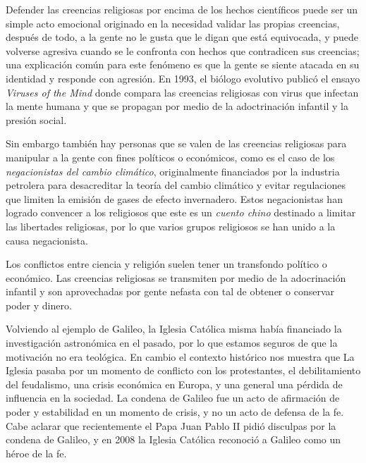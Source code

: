 Defender las creencias religiosas por encima de los hechos científicos puede ser
un simple acto emocional originado en la necesidad validar las propias
creencias, después de todo, a la gente no le gusta que le digan que está
equivocada, y puede volverse agresiva cuando se le confronta con hechos que
contradicen sus creencias; una explicación común para este fenómeno es que la
gente se siente atacada en su identidad y responde con agresión.
En 1993, el biólogo evolutivo  publicó
el ensayo \emph{Viruses of the Mind}\cite{Dahlbom1993-ky} donde compara las
creencias religiosas con virus que infectan la mente humana y que se propagan
por medio de la adoctrinación infantil y la presión social.

Sin embargo también hay personas que se valen de las creencias religiosas para
manipular a la gente con fines políticos o económicos, como es el caso de los
\emph{negacionistas del cambio climático}, originalmente financiados por la
industria petrolera para desacreditar la teoría del cambio climático y evitar
regulaciones que limiten la emisión de gases de efecto invernadero.
Estos negacionistas han logrado convencer a los religiosos que este es un
\emph{cuento chino} destinado a limitar las libertades religiosas, por lo que
varios grupos religiosos se han unido a la causa negacionista.

\begin{remember}
    \label{rem:religion}
    Los conflictos entre ciencia y religión suelen tener un transfondo político
    o económico.
    Las creencias religiosas se transmiten por medio de la adocrinación
    infantil y son aprovechadas por gente nefasta con tal de obtener o conservar
    poder y dinero.
\end{remember}

Volviendo al ejemplo de Galileo, la Iglesia Católica misma había financiado la
investigación astronómica en el pasado, por lo que estamos seguros de que la
motivación no era teológica.
En cambio el contexto histórico nos muestra que La Iglesia pasaba por un momento
de conflicto con los protestantes, el debilitamiento del feudalismo, una crisis
económica en Europa, y una general una pérdida de influencia en la sociedad.
La condena de Galileo fue un acto de afirmación de poder y estabilidad en un
momento de crisis, y no un acto de defensa de la fe.
Cabe aclarar que recientemente el Papa Juan Pablo II pidió disculpas por la
condena de Galileo, y en 2008 la Iglesia Católica reconoció a Galileo como un
héroe de la fe.

